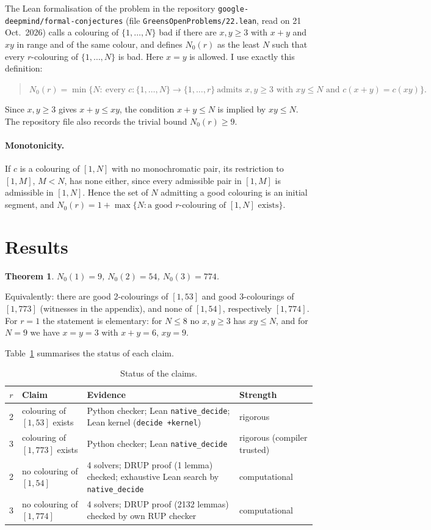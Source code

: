 \documentclass[11pt]{article}
\newtheorem{theorem}{Theorem}
\begin{document}
The Lean formalisation of the problem in the repository \texttt{google-deepmind/formal-conjectures} (file \texttt{GreensOpenProblems/22.lean}, read on 21 Oct.\ 2026) \cite{fc} calls a colouring of $\{1,\dots,N\}$ bad if there are $x,y\ge3$ with $x+y$ and $xy$ in range and of the same colour, and defines $N_0(r)$ as the least $N$ such that every $r$-colouring of $\{1,\dots,N\}$ is bad. Here $x=y$ is allowed. I use exactly this definition:
\begin{quote}
$N_0(r)=\min\{N:\ \text{every } c:\{1,\dots,N\}\to\{1,\dots,r\}\ \text{admits } x,y\ge3 \text{ with } xy\le N \text{ and } c(x+y)=c(xy)\}.$
\end{quote}
Since $x,y\ge3$ gives $x+y\le xy$, the condition $x+y\le N$ is implied by $xy\le N$. The repository file also records the trivial bound $N_0(r)\ge9$.

\paragraph{Monotonicity.} If $c$ is a colouring of $[1,N]$ with no monochromatic pair, its restriction to $[1,M]$, $M<N$, has none either, since every admissible pair in $[1,M]$ is admissible in $[1,N]$. Hence the set of $N$ admitting a good colouring is an initial segment, and $N_0(r)=1+\max\{N: \text{a good } r\text{-colouring of }[1,N]\text{ exists}\}$.

\section{Results}
\begin{theorem}
$N_0(1)=9$, $N_0(2)=54$, $N_0(3)=774$.
\end{theorem}
Equivalently: there are good 2-colourings of $[1,53]$ and good 3-colourings of $[1,773]$ (witnesses in the appendix), and none of $[1,54]$, respectively $[1,774]$. For $r=1$ the statement is elementary: for $N\le8$ no $x,y\ge3$ has $xy\le N$, and for $N=9$ we have $x=y=3$ with $x+y=6$, $xy=9$.

Table~\ref{tab:res} summarises the status of each claim.
\begin{table}[h]
\centering\small
\begin{tabular}{@{}cp{3.2cm}p{6.6cm}l@{}}
\toprule
$r$ & Claim & Evidence & Strength\\
\midrule
2 & colouring of $[1,53]$ exists & Python checker; Lean \texttt{native\_decide}; Lean kernel (\texttt{decide +kernel}) & rigorous\\
3 & colouring of $[1,773]$ exists & Python checker; Lean \texttt{native\_decide} & rigorous (compiler trusted)\\
2 & no colouring of $[1,54]$ & 4 solvers; DRUP proof (1 lemma) checked; exhaustive Lean search by \texttt{native\_decide} & computational\\
3 & no colouring of $[1,774]$ & 4 solvers; DRUP proof (2132 lemmas) checked by own RUP checker & computational\\
\bottomrule
\end{tabular}
\caption{Status of the claims.}\label{tab:res}
\end{table}
\end{document}
